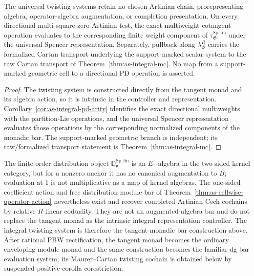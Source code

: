 \begin{proposition}
\label{prop:as-raw-twisting-comparison}
The universal twisting systems retain no chosen Artinian chain,
prorepresenting algebra, operator-algebra augmentation, or completion
presentation.  On every directional multi-square-zero Artinian test, the
exact multiweight cotangent operation evaluates to the corresponding finite
weight component of
$\tau_{\mathfrak G}^{\mathrm{Sp,fm}}$ under the universal Spencer
representation.  Separately, pullback along
$\lambda^R_{\mathfrak G}$ carries the formalized Cartan transport underlying
the support-marked scalar system to the raw Cartan transport of
Theorem~\ref{thm:as-integral-mc}.  No map from a support-marked geometric cell
to a directional PD operation is asserted.
\end{proposition}

\begin{proof}
The twisting system is constructed directly from the tangent monad and its
algebra action, so it is intrinsic in the controller and representation.
Corollary~\ref{cor:as-integral-pd-arity} identifies the exact directional
multiweights with the partition-Lie operations, and the universal Spencer
representation evaluates those operations by the corresponding normalized
components of the monadic bar.  The support-marked geometric branch is
independent; its raw/formalized transport statement is
Theorem~\ref{thm:as-integral-mc}.
\end{proof}

\begin{remark}
The finite-order distribution object
$\mathbb D_{\mathfrak a}^{\mathrm{Sp,fin}}$ is an $E_1$-algebra in the
two-sided kernel category, but for a nonzero anchor it has no canonical
augmentation to $B$; evaluation at $1$ is not multiplicative as a map of
kernel algebras.  The one-sided coefficient action and free distribution
module bar of
Theorem~\ref{thm:as-cellwise-operator-action} nevertheless exist and recover
completed Artinian Cech cochains by relative $R$-linear coduality.  They are not an
augmented-algebra bar and do not replace the tangent monad as the intrinsic
integral representation controller.  The integral twisting system is
therefore the tangent-monadic bar construction above.  After rational PBW
rectification, the tangent monad becomes the ordinary enveloping-module monad
and the same construction becomes the familiar dg bar evaluation system; its
Maurer--Cartan twisting cochain is obtained below by suspended
positive-corolla corestriction.
\end{remark}

